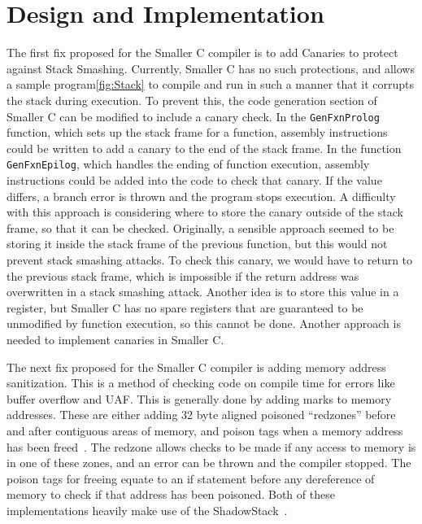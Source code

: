 \documentclass[sigconf, anonymous]{acmart}
\newcommand{\code}[1]{\texttt{#1}}
\begin{document}
\section{Design and Implementation}
\label{design}

The first fix proposed for the Smaller C compiler is to add Canaries to protect against Stack Smashing. Currently, Smaller C has no such protections, and allows a sample program\ref{fig:Stack} to compile and run in such a manner that it corrupts the stack during execution. To prevent this, the code generation section of Smaller C can be modified to include a canary check. In the \code{GenFxnProlog} function, which sets up the stack frame for a function, assembly instructions could be written to add a canary to the end of the stack frame. In the function \code{GenFxnEpilog}, which handles the ending of function execution, assembly instructions could be added into the code to check that canary. If the value differs, a branch error is thrown and the program stops execution. A difficulty with this approach is considering where to store the canary outside of the stack frame, so that it can be checked. Originally, a sensible approach seemed to be storing it inside the stack frame of the previous function, but this would not prevent stack smashing attacks. To check this canary, we would have to return to the previous stack frame, which is impossible if the return address was overwritten in a stack smashing attack. Another idea is to store this value in a register, but Smaller C has no spare registers that are guaranteed to be unmodified by function execution, so this cannot be done. Another approach is needed to implement canaries in Smaller C.



The next fix proposed for the Smaller C compiler is adding memory address sanitization. This is a method of checking code on compile time for errors like buffer overflow and UAF. This is generally done by adding marks to memory addresses. These are either adding 32 byte aligned poisoned “redzones” before and after contiguous areas of memory, and poison tags when a memory address has been freed~\cite{AddressSanitizeWiki}. The redzone allows checks to be made if any access to memory is in one of these zones, and an error can be thrown and the compiler stopped. The poison tags for freeing equate to an if statement before any dereference of memory to check if that address has been poisoned. Both of these implementations heavily make use of the ShadowStack~\cite{Serebryany:AddressSanitize}.
\end{document}

